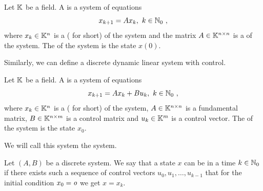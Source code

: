 \begin{definition}
	Let $\mathbb{K}$ be a field. A  is a system of equations
	$$x_{k+1}=Ax_k,\ k\in\N_0\ ,$$
	where $x_k\in \mathbb{K}^n$ is a  ( for short) of the system and the matrix $A\in \mathbb{K}^{n\times n}$ is a  of the system. The  of the system is the state $x(0)$.
\end{definition}

Similarly, we can define a discrete dynamic linear system with control.

\begin{definition}
	Let $\mathbb{K}$ be a field. A  is a system of equations
	$$x_{k+1}=Ax_k+Bu_k,\ k\in\N_0\ ,$$
	where $x_k\in\mathbb{K}^n$ is a  ( for short) of the system, $A\in\mathbb{K}^{n\times n}$ is a fundamental matrix, $B\in\mathbb{K}^{n\times m}$ is a control matrix and $u_k\in\mathbb{K}^m$ is a control vector. The  of the system is the state $x_0$.

	We will call this system the  system.
\end{definition}

\begin{definition}
	Let $(A,B)$ be a discrete system. We say that a state $x$ can be  in a time $k\in\mathbb{N}_0$ if there exists such a sequence of control vectors $u_0,u_1,\ldots,u_{k-1}$ that for the initial condition $x_0=\textit{o}$ we get $x=x_k$.
\end{definition}

